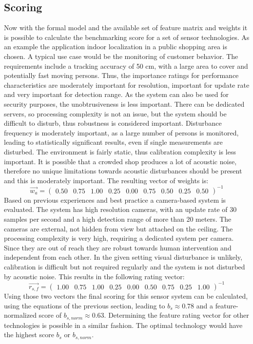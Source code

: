 \subsection{Scoring}
Now with the formal model and the available set of feature matrix and weights it is possible to calculate the benchmarking score for a set of sensor technologies. As an example the application indoor localization in a public shopping area is chosen. A typical use case would be the monitoring of customer behavior. The requirements include a tracking accuracy of 50 cm, with a large area to cover and potentially fast moving persons. Thus, the importance ratings for performance characteristics are moderately important for resolution, important for update rate and very important for detection range. As the system can also be used for security purposes, the unobtrusiveness is less important. There can be dedicated servers, so processing complexity is not an issue, but the system should be difficult to disturb, thus robustness is considered important. Disturbance frequency is moderately important, as a large number of persons is monitored, leading to statistically significant results, even if single measurements are disturbed. The environment is fairly static, thus calibration complexity is less important. It is possible that a crowded shop produces a lot of acoustic noise, therefore no unique limitations towards acoustic disturbances should be present and this is moderately important. The resulting vector of weights is:
\begin{equation}
\overrightarrow{w_a}=
\begin{pmatrix}
0.50 & 0.75 & 1.00 & 0.25 & 0.00 & 0.75 & 0.50 & 0.25 & 0.50
\end{pmatrix}^{-1}
\end{equation}
Based on previous experiences and best practice a camera-based system is evaluated. The system has high resolution cameras, with an update rate of 30 samples per second and a high detection range of more than 20 meters. The cameras are external, not hidden from view but attached on the ceiling. The processing complexity is very high, requiring a dedicated system per camera. Since they are out of reach they are robust towards human intervention and independent from each other. In the given setting visual disturbance is unlikely, calibration is difficult but not required regularly and the system is not disturbed by acoustic noise. This results in the following rating vector:
\begin{equation}
\overrightarrow{r_{s,f}}=
\begin{pmatrix}
1.00 & 0.75 & 1.00 & 0.25 & 0.00 & 0.50 & 0.75 & 0.25 & 1.00
\end{pmatrix}^{-1}
\end{equation}
Using those two vectors the final scoring for this sensor system can be calculated, using the equations of the previous section, leading to $b_s \approx 0.78$ and a feature-normalized score of $b_{s,norm} \approx 0.63$. Determining the feature rating vector for other technologies is possible in a similar fashion. The optimal technology would have the highest score $b_s$ or $b_{s,norm}$.
\clearpage
